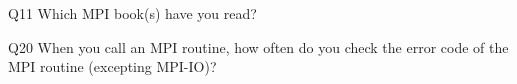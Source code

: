 \begin{description}%
\item{Q11} Which MPI book(s) have you read?%
\item{Q20} When you call an MPI routine, how often do you check the error code of the MPI routine  (excepting MPI-IO)?%
\end{description}%
